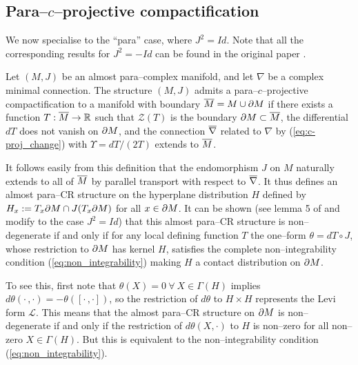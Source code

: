 \subsection{Para--$c$--projective compactification}

We now specialise to the ``para'' case, where $J^2=Id$. Note that all the corresponding results for $J^2=-Id$ can be found in the original paper \cite{CG}.

\begin{defi}
\label{defi_1}  Let $(M,J)$ be an almost para--complex manifold, and let $\nabla$ be a complex minimal connection. The structure $(M,J)$ admits a para--$c$--projective compactification to a manifold with boundary $\overline{M}=M\cup\partial M$
if there exists a function $T:\overline{M}\rightarrow \mathbb{R}$ such that $\mathcal{Z}(T)$ is the boundary
$\partial M\subset \overline{M}$, the differential $dT$ does not vanish on $\partial M$, and the connection $\overline{\nabla}$ related to $\nabla$ by (\ref{eq:c-proj_change}) with $\Upsilon = dT/(2T)$ extends to $\overline{M}$.
\end{defi}



It follows easily from this definition that the endomorphism $J$ on $M$ naturally extends to all of $\overline{M}$ by parallel transport with respect to $\overline{\nabla}$. It thus defines an almost para--CR structure on the hyperplane distribution $ H $ defined by $ H _x:=T_x\partial M \cap J(T_x \partial M)$ for all $x\in\partial M$. It can be shown (see lemma 5 of \cite{CG} and modify to the case $J^2=Id$) that this almost para--CR structure is non--degenerate if and only if for any local defining function $T$ the one--form $\theta=dT\circ J$, whose restriction to $\partial M$ has kernel $ H $, satisfies the complete non--integrability condition (\ref{eq:non_integrability}) making $ H $ a contact distribution on $\partial M$.

To see this, first note that $\theta(X)=0\ \forall\ X\in\Gamma( H )$ implies $d\theta(\cdot\,,\cdot)=-\theta([\cdot\,,\cdot])$, so the restriction of $d\theta$ to $ H \times H $ represents the Levi form $\mathcal{L}$. This means that the almost para--CR structure on $\partial M$ is non--degenerate if and only if the restriction of $d\theta(X,\cdot)$ to $ H $ is non--zero for all non--zero $X\in\Gamma( H )$. But this is equivalent to the non--integrability condition (\ref{eq:non_integrability}).


